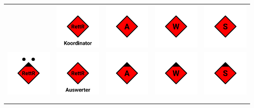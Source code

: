\begin{table}[h]
\centering
\begin{tabular}{ccccc}
& \includegraphics[width=0.15\linewidth]{images/RettR_p_Koordinator.pdf} & \includegraphics[width=0.15\linewidth]{images/RettR_p_atm.pdf} & \includegraphics[width=0.15\linewidth]{images/RettR_p_wtm.pdf} & \includegraphics[width=0.15\linewidth]{images/RettR_p_stm.pdf}
\\
\includegraphics[width=0.15\linewidth]{images/RettR_p_Gruppenfuehrer.pdf} & \includegraphics[width=0.15\linewidth]{images/RettR_p_Auswerter.pdf} & \includegraphics[width=0.15\linewidth]{images/RettR_p_atf.pdf} & \includegraphics[width=0.15\linewidth]{images/RettR_p_wtf.pdf} & \includegraphics[width=0.15\linewidth]{images/RettR_p_stf.pdf}
\\
\\ \hline
& & \angriffstrupp{} & \wassertrupp{} & \schlauchtrupp{}

\end{tabular}
\end{table}

